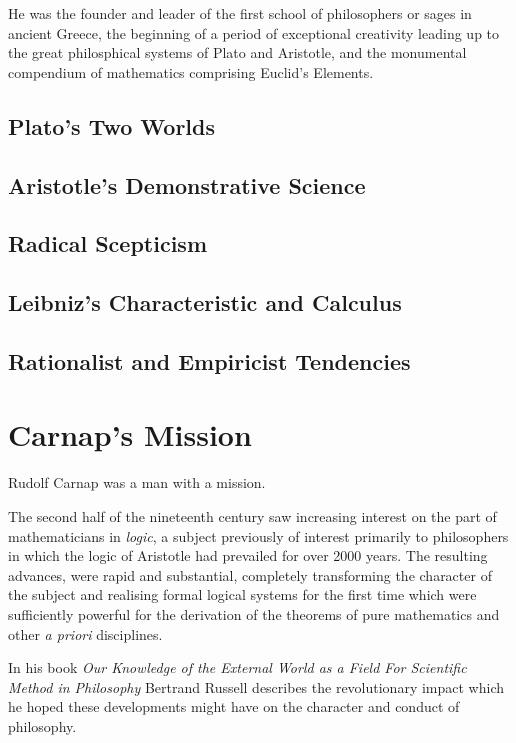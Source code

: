 He was the founder and leader of the first school of philosophers or sages in ancient Greece, the beginning of a period of exceptional creativity leading up to the great philosphical systems of Plato and Aristotle, and the monumental compendium of mathematics comprising Euclid's Elements.

\section{Plato's Two Worlds}

\section{Aristotle's Demonstrative Science}

\section{Radical Scepticism} 

\section{Leibniz's Characteristic and Calculus}

\section{Rationalist and Empiricist Tendencies}


\chapter{Carnap's Mission}

Rudolf Carnap was a man with a mission.

The second half of the nineteenth century saw increasing interest on the part of mathematicians
in \emph{logic}, a subject previously of interest primarily to philosophers
in which the logic of Aristotle had prevailed for over 2000 years.
The resulting advances, were rapid and substantial, completely transforming the character
of the subject and realising formal logical systems for the first time which were sufficiently powerful
for the derivation of the theorems of pure mathematics and other \emph{a priori} disciplines.  

In his book \emph{Our Knowledge of the External World as a Field For Scientific Method in Philosophy} \cite{russell21} Bertrand Russell describes the revolutionary impact which he hoped these developments might have on the character and conduct of philosophy.

